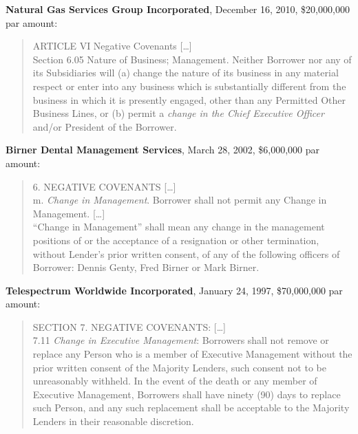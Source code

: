 \documentclass[12pt]{article}
\begin{document}
\begin{appendices}
\noindent
\textbf{Natural Gas Services Group Incorporated}, December 16, 2010, \$20,000,000 par amount:
\begin{quote}
\singlespacing \vspace{-8pt}
ARTICLE VI Negative Covenants  [\dots]\\
Section 6.05 Nature of Business; Management. Neither Borrower nor any of its Subsidiaries will (a) change the nature of its business in any material respect or enter into any business which is substantially different from the business in which it is presently engaged, other than any Permitted Other Business Lines, or (b) permit a \textit{change in the Chief Executive Officer} and/or President of the Borrower.
\end{quote}


\noindent
\textbf{Birner Dental Management Services}, March 28, 2002, \$6,000,000 par amount:
\begin{quote}
\singlespacing \vspace{-8pt}
6. NEGATIVE COVENANTS  [\dots]\\
m. \textit{Change in Management}. Borrower shall not permit any Change in Management.  [\dots]\\
``Change in Management'' shall mean any change in the management positions of or the acceptance of a resignation or other termination, without Lender's prior written consent, of any of the following officers of Borrower: Dennis Genty, Fred Birner or Mark Birner.
\end{quote}


\noindent
\textbf{Telespectrum Worldwide Incorporated}, January 24, 1997, \$70,000,000 par amount:
\begin{quote}
\singlespacing \vspace{-8pt}
SECTION 7. NEGATIVE COVENANTS:  [\dots]\\
7.11 \textit{Change in Executive Management}: Borrowers shall not remove or replace any Person who is a member of Executive Management without the prior written consent of the Majority Lenders, such consent not to be unreasonably withheld. In the event of the death or any member of Executive Management, Borrowers shall have ninety (90) days to replace such Person, and any such replacement shall be acceptable to the Majority Lenders in their reasonable discretion.
\end{quote}



\end{appendices}
\end{document}
